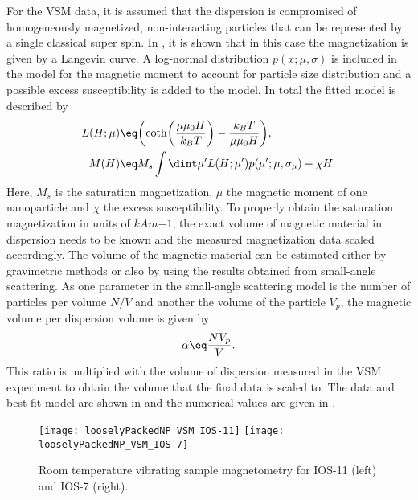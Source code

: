 \documentclass[\main/dresen_thesis.tex]{subfiles}
\begin{document}
For the VSM data, it is assumed that the dispersion is compromised of homogeneously magnetized, non-interacting particles that can be represented by a single classical super spin.
In , it is shown that in this case the magnetization is given by a Langevin curve.
A log-normal distribution $p(x; \mu, \sigma)$ is included in the model for the magnetic moment to account for particle size distribution and a possible excess susceptibility is added to the model.
In total the fitted model is described by
\begin{align}
  L(H; \mu) \eq& \biggl( \coth \biggl(\frac{\mu \mu_0 H}{k_B T} \biggr) - \frac{k_B T}{\mu \mu_0 H} \biggr),\\
  M(H) \eq& M_s \int \dint \mu^\prime L(H; \mu^\prime) p(\mu^\prime; \mu, \sigma_{\mu}) + \chi H.
\end{align}
Here, $M_s$ is the saturation magnetization, $\mu$ the magnetic moment of one nanoparticle and $\chi$ the excess susceptibility.
To properly obtain the saturation magnetization in units of $\unit{kAm{-1}}$, the exact volume of magnetic material in dispersion needs to be known and the measured magnetization data scaled accordingly.
The volume of the magnetic material can be estimated either by gravimetric methods or also by using the results obtained from small-angle scattering.
As one parameter in the small-angle scattering model is the number of particles per volume $N/V$ and another the volume of the particle $V_p$, the magnetic volume per dispersion volume is given by
\begin{align}
  \alpha \eq \frac{N V_p}{V}.
\end{align}
This ratio is multiplied with the volume of dispersion measured in the VSM experiment to obtain the volume that the final data is scaled to.
The data and best-fit model are shown in  and the numerical values are given in .

\begin{figure}[tb]
  \centering
  \texttt{[image: looselyPackedNP\_VSM\_IOS-11]}
  \texttt{[image: looselyPackedNP\_VSM\_IOS-7]}
  \caption{\label{fig:looselyPackedNP:nanoparticle:vsm}Room temperature vibrating sample magnetometry for IOS-11 (left) and IOS-7 (right).}
\end{figure}
\end{document}
